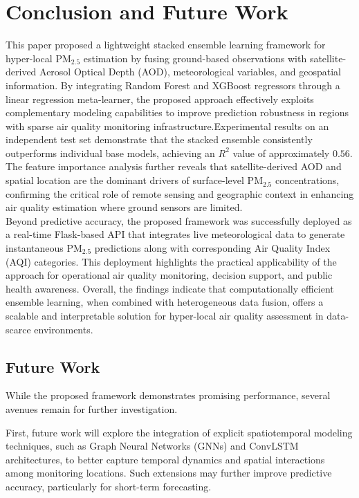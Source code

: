 \documentclass[conference]{IEEEtran}
\begin{document}
\section{Conclusion and Future Work}
\label{sec:conclusion}
This paper proposed a lightweight stacked ensemble learning framework for hyper-local PM$_{2.5}$ estimation by fusing ground-based observations with satellite-derived Aerosol Optical Depth (AOD), meteorological variables, and geospatial information. By integrating Random Forest and XGBoost regressors through a linear regression meta-learner, the proposed approach effectively exploits complementary modeling capabilities to improve prediction robustness in regions with sparse air quality monitoring infrastructure.Experimental results on an independent test set demonstrate that the stacked ensemble consistently outperforms individual base models, achieving an $R^2$ value of approximately $0.56$. The feature importance analysis further reveals that satellite-derived AOD and spatial location are the dominant drivers of surface-level PM$_{2.5}$ concentrations, confirming the critical role of remote sensing and geographic context in enhancing air quality estimation where ground sensors are limited.\\
Beyond predictive accuracy, the proposed framework was successfully deployed as a real-time Flask-based API that integrates live meteorological data to generate instantaneous PM$_{2.5}$ predictions along with corresponding Air Quality Index (AQI) categories. This deployment highlights the practical applicability of the approach for operational air quality monitoring, decision support, and public health awareness. Overall, the findings indicate that computationally efficient ensemble learning, when combined with heterogeneous data fusion, offers a scalable and interpretable solution for hyper-local air quality assessment in data-scarce environments.

\subsection{Future Work}

While the proposed framework demonstrates promising performance, several avenues remain for further investigation. 

First, future work will explore the integration of explicit spatiotemporal modeling techniques, such as Graph Neural Networks (GNNs) and ConvLSTM architectures, to better capture temporal dynamics and spatial interactions among monitoring locations. Such extensions may further improve predictive accuracy, particularly for short-term forecasting.
\end{document}
